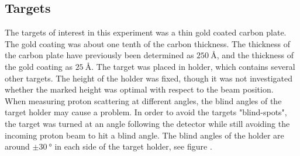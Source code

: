 \subsection{Targets}
The targets of interest in this experiment was a thin gold coated carbon plate. The gold coating was about one tenth of the carbon thickness. The thickness of the carbon plate have previously been determined as $\SI{250}{\angstrom}$, and the thickness of the gold coating as $\SI{25}{\angstrom}$.\footnotemark {} 
The target was placed in holder, which contains several other targets. The height of the holder was fixed, though it was not investigated whether the marked height was optimal with respect to the beam position.\\

When measuring proton scattering at different angles, the blind angles of the
target holder may cause a problem. In order to avoid the targets "blind-spots",
the target was turned at an angle following the detector while still avoiding
the incoming proton beam to hit a blind angle. The blind angles of the holder
are around $\pm \SI{30}{\degree}$ in each side of the target holder, see figure .  



%

